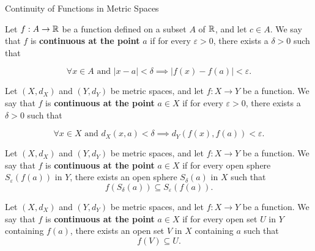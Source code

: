\documentclass[12pt, a4paper]{article}
\begin{document}
\FrontPage
\Large


\begin{heading}
    Continuity of Functions in Metric Spaces
\end{heading}

\vspace{10pt}

\begin{definition}
    Let $f : A \to \mathbb{R}$ be a function defined on a subset $A$ of $\mathbb{R}$, and let $c \in A$. We say that $f$ is \textbf{continuous at the point} $a$ if for every $\varepsilon > 0$, there exists a $\delta > 0$ such that 
    
    \[\forall x \in A \text{ and } |x - a| < \delta \implies |f(x) - f(a)| < \varepsilon.\]
\end{definition}

\vspace{100pt}

\begin{definition}
    Let $(X, d_X)$ and $(Y, d_Y)$ be metric spaces, and let $f : X \to Y$ be a function. We say that $f$ is \textbf{continuous at the point} $a \in X$ if for every $\varepsilon > 0$, there exists a $\delta > 0$ such that 
    
    \[\forall x \in X \text{ and } d_X(x, a) < \delta \implies d_Y(f(x), f(a)) < \varepsilon.\]
\end{definition}

\clearpage

\begin{definition}
    Let $(X, d_X)$ and $(Y, d_Y)$ be metric spaces, and let $f : X \to Y$ be a function. We say that $f$ is \textbf{continuous at the point} $a \in X$ if for every open sphere $S_{\varepsilon}(f(a))$ in $Y$, there exists an open sphere $S_{\delta}(a)$ in $X$ such that
    \[f(S_{\delta}(a)) \subseteq S_{\varepsilon}(f(a)).\]    
\end{definition}

\clearpage

\begin{definition}
    Let $(X, d_X)$ and $(Y, d_Y)$ be metric spaces, and let $f : X \to Y$ be a function. We say that $f$ is \textbf{continuous at the point} $a \in X$ if for every open set $U$ in $Y$ containing $f(a)$, there exists an open set $V$ in $X$ containing $a$ such that
    \[f(V) \subseteq U.\]
\end{definition}
\end{document}
